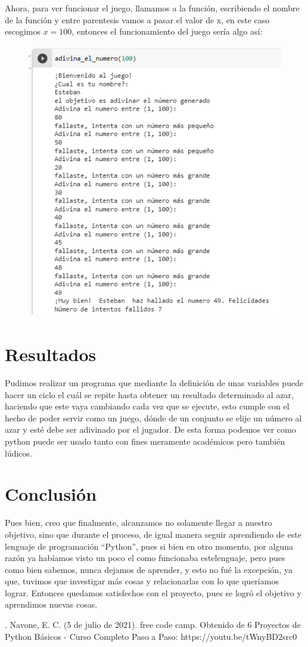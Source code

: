 \documentclass[a4paper,12pt]{article}
\begin{document}
\large{Ahora, para ver funcionar el juego, llamamos a la función, escribiendo el nombre de la función y entre parentesis vamos a pasar el valor de x, en este caso escogimos $x=100$, entonces el funcionamiento del juego sería algo así:}

    \begin{figure}[H]
    \caption{}
    \centering \includegraphics[width=16cm, height=12cm]{a_16.png}
    \label{fig1:my_label}
    \end{figure}  

\section{Resultados}
\large{Pudimos realizar un programa que mediante la definición de unas variables puede hacer un ciclo el cuál se repite hasta obtener un resultado determinado al azar, haciendo que este vaya cambiando cada vez que se ejecute, esto cumple con el hecho de poder servir como un juego, dónde de un conjunto se elije un número al azar y esté debe ser adivinado por el jugador. De esta forma podemos ver como python puede ser usado tanto con fines meramente académicos pero también lúdicos.}

\section{Conclusión}
\large{Pues bien, creo que finalmente, alcanzamos no solamente llegar a nuestro objetivo, sino que durante el proceso, de igual manera seguir aprendiendo de este lenguaje de programación ``Python'', pues si bien en otro momento, por alguna razón ya habíamos visto un poco el como funcionaba estelenguaje, pero pues como bien sabemos, nunca dejamos de aprender, y esto no fué la excepción, ya que, tuvimos que investigar más cosas y relacionarlas con lo que queríamos lograr. Entonces quedamos satisfechos con el proyecto, pues se logró el objetivo y aprendimos nuevas cosas.}


\begin{thebibliography}{}
\bibitem{}. Navone, E. C. (5 de julio de 2021). free code camp. Obtenido de 6 Proyectos de Python Básicos - Curso Completo Paso a Paso: https://youtu.be/tWnyBD2src0

\end{thebibliography}
\end{document}
